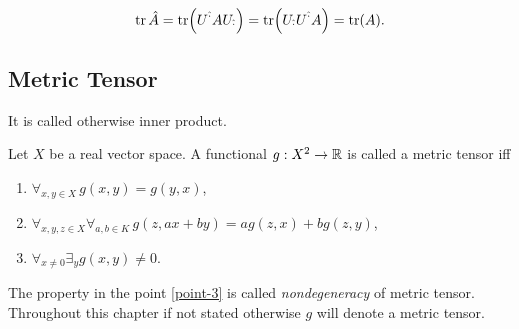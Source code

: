\documentclass[main.tex]{subfiles}
\begin{document}
\begin{equation}
\label{invariance-of-trace}
\tr \hat{A} = \tr(U^{\hat{\cdot}}A U_{\hat{\cdot}}) = \tr(U_{\hat{\cdot}} U^{\hat{\cdot}}A) = \tr(A).
\end{equation} 

\subsection{Metric Tensor}
It is called otherwise inner product.
\begin{definition}
\label{metric-tensor-def}
Let $X$ be a real vector space. A functional $g:X^2\to \mathbb{R}$ is called a metric tensor iff
\begin{enumerate}
\item $\forall_{x,y\in X} \, g(x,y) = g(y,x)$,
\item $\forall_{x, y, z\in X}\forall_{a,b\in K} \, g(z, ax + by) = ag(z,x) + bg(z,y)$,
\item \label{point-3}$\forall_{x\not=0}\exists_y g(x, y)\not= 0$. 
\end{enumerate}
\end{definition}

The property in the point \ref{point-3} is called \textit{nondegeneracy} of metric tensor.
Throughout this chapter if not stated otherwise $g$ will denote a metric tensor.
\end{document}
